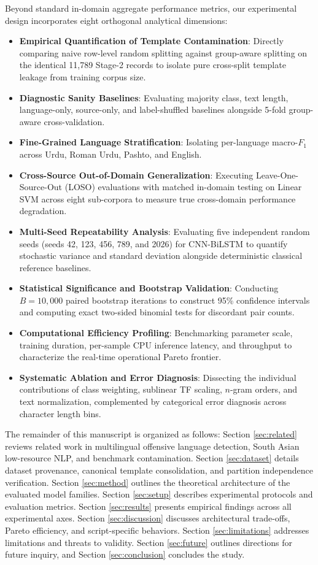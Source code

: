 \documentclass[11pt,a4paper]{article}
\begin{document}
Beyond standard in-domain aggregate performance metrics, our experimental design incorporates eight orthogonal analytical dimensions:
\begin{itemize}
    \item \textbf{Empirical Quantification of Template Contamination}: Directly comparing naive row-level random splitting against group-aware splitting on the identical 11,789 Stage-2 records to isolate pure cross-split template leakage from training corpus size.
    \item \textbf{Diagnostic Sanity Baselines}: Evaluating majority class, text length, language-only, source-only, and label-shuffled baselines alongside 5-fold group-aware cross-validation.
    \item \textbf{Fine-Grained Language Stratification}: Isolating per-language macro-$F_1$ across Urdu, Roman Urdu, Pashto, and English.
    \item \textbf{Cross-Source Out-of-Domain Generalization}: Executing Leave-One-Source-Out (LOSO) evaluations with matched in-domain testing on Linear SVM across eight sub-corpora to measure true cross-domain performance degradation.
    \item \textbf{Multi-Seed Repeatability Analysis}: Evaluating five independent random seeds (seeds 42, 123, 456, 789, and 2026) for CNN-BiLSTM to quantify stochastic variance and standard deviation alongside deterministic classical reference baselines.
    \item \textbf{Statistical Significance and Bootstrap Validation}: Conducting $B = 10,000$ paired bootstrap iterations to construct 95\% confidence intervals and computing exact two-sided binomial tests for discordant pair counts.
    \item \textbf{Computational Efficiency Profiling}: Benchmarking parameter scale, training duration, per-sample CPU inference latency, and throughput to characterize the real-time operational Pareto frontier.
    \item \textbf{Systematic Ablation and Error Diagnosis}: Dissecting the individual contributions of class weighting, sublinear TF scaling, $n$-gram orders, and text normalization, complemented by categorical error diagnosis across character length bins.
\end{itemize}

The remainder of this manuscript is organized as follows: Section \ref{sec:related} reviews related work in multilingual offensive language detection, South Asian low-resource NLP, and benchmark contamination. Section \ref{sec:dataset} details dataset provenance, canonical template consolidation, and partition independence verification. Section \ref{sec:method} outlines the theoretical architecture of the evaluated model families. Section \ref{sec:setup} describes experimental protocols and evaluation metrics. Section \ref{sec:results} presents empirical findings across all experimental axes. Section \ref{sec:discussion} discusses architectural trade-offs, Pareto efficiency, and script-specific behaviors. Section \ref{sec:limitations} addresses limitations and threats to validity. Section \ref{sec:future} outlines directions for future inquiry, and Section \ref{sec:conclusion} concludes the study.
\end{document}
